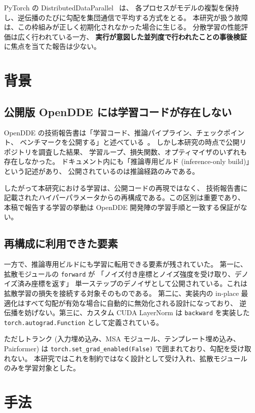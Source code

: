 \documentclass[11pt,a4paper]{article}
\begin{document}
PyTorch の DistributedDataParallel~\cite{li-2020-pytorch} は、
各プロセスがモデルの複製を保持し、逆伝播のたびに勾配を集団通信で平均する方式をとる。
本研究が扱う故障は、この枠組みが正しく初期化されなかった場合に生じる。
分散学習の性能評価は広く行われている一方、
\textbf{実行が意図した並列度で行われたことの事後検証}に焦点を当てた報告は少ない。

\section{背景}

\subsection{公開版 OpenDDE には学習コードが存在しない}

OpenDDE の技術報告書は「学習コード、推論パイプライン、チェックポイント、
ベンチマークを公開する」と述べている~\cite{project-2026-folding}。
しかし本研究の時点で公開リポジトリを調査した結果、
学習ループ、損失関数、オプティマイザのいずれも存在しなかった。
ドキュメント内にも「推論専用ビルド (inference-only build)」という記述があり、
公開されているのは推論経路のみである。

したがって本研究における学習は、公開コードの再現ではなく、
技術報告書に記載されたハイパーパラメータからの再構成である。この区別は重要であり、
本稿で報告する学習の挙動は OpenDDE 開発陣の学習手順と一致する保証がない。

\subsection{再構成に利用できた要素}

一方で、推論専用ビルドにも学習に転用できる要素が残されていた。
第一に、拡散モジュールの \texttt{forward} が
「ノイズ付き座標とノイズ強度を受け取り、デノイズ済み座標を返す」
単一ステップのデノイザとして公開されている。これは拡散学習の損失を接続する対象そのものである。
第二に、実装内の in-place 最適化はすべて勾配が有効な場合に自動的に無効化される設計になっており、
逆伝播を妨げない。第三に、カスタム CUDA LayerNorm は \texttt{backward} を実装した
\texttt{torch.autograd.Function} として定義されている。

ただしトランク (入力埋め込み、MSA モジュール、テンプレート埋め込み、Pairformer) は
\texttt{torch.set\_grad\_enabled(False)} で囲まれており、勾配を受け取れない。
本研究ではこれを制約ではなく設計として受け入れ、拡散モジュールのみを学習対象とした。

\section{手法}
\end{document}
